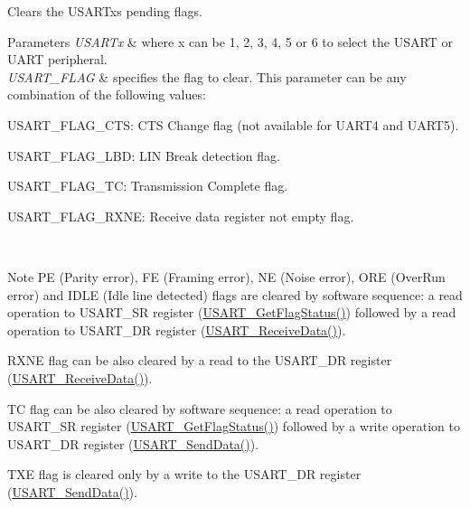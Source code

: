 Clears the U\+S\+A\+R\+Tx\textquotesingle{}s pending flags. 


\begin{DoxyParams}{Parameters}
{\em U\+S\+A\+R\+Tx} & where x can be 1, 2, 3, 4, 5 or 6 to select the U\+S\+A\+RT or U\+A\+RT peripheral. \\
\hline
{\em U\+S\+A\+R\+T\+\_\+\+F\+L\+AG} & specifies the flag to clear. This parameter can be any combination of the following values\+: \begin{DoxyItemize}
\item U\+S\+A\+R\+T\+\_\+\+F\+L\+A\+G\+\_\+\+C\+TS\+: C\+TS Change flag (not available for U\+A\+R\+T4 and U\+A\+R\+T5). \item U\+S\+A\+R\+T\+\_\+\+F\+L\+A\+G\+\_\+\+L\+BD\+: L\+IN Break detection flag. \item U\+S\+A\+R\+T\+\_\+\+F\+L\+A\+G\+\_\+\+TC\+: Transmission Complete flag. \item U\+S\+A\+R\+T\+\_\+\+F\+L\+A\+G\+\_\+\+R\+X\+NE\+: Receive data register not empty flag.\end{DoxyItemize}
\\
\hline
\end{DoxyParams}
\begin{DoxyNote}{Note}
PE (Parity error), FE (Framing error), NE (Noise error), O\+RE (Over\+Run error) and I\+D\+LE (Idle line detected) flags are cleared by software sequence\+: a read operation to U\+S\+A\+R\+T\+\_\+\+SR register (\hyperlink{group___u_s_a_r_t___group9_ga144630722defc9e312f0ad280b68e9da}{U\+S\+A\+R\+T\+\_\+\+Get\+Flag\+Status()}) followed by a read operation to U\+S\+A\+R\+T\+\_\+\+DR register (\hyperlink{group___u_s_a_r_t___group2_gac67a91845b0b1d54d31bdfb1c5e9867c}{U\+S\+A\+R\+T\+\_\+\+Receive\+Data()}). 

R\+X\+NE flag can be also cleared by a read to the U\+S\+A\+R\+T\+\_\+\+DR register (\hyperlink{group___u_s_a_r_t___group2_gac67a91845b0b1d54d31bdfb1c5e9867c}{U\+S\+A\+R\+T\+\_\+\+Receive\+Data()}). 

TC flag can be also cleared by software sequence\+: a read operation to U\+S\+A\+R\+T\+\_\+\+SR register (\hyperlink{group___u_s_a_r_t___group9_ga144630722defc9e312f0ad280b68e9da}{U\+S\+A\+R\+T\+\_\+\+Get\+Flag\+Status()}) followed by a write operation to U\+S\+A\+R\+T\+\_\+\+DR register (\hyperlink{group___u_s_a_r_t___group2_ga0b43d42da9540f446d494bf69823c6fb}{U\+S\+A\+R\+T\+\_\+\+Send\+Data()}). 

T\+XE flag is cleared only by a write to the U\+S\+A\+R\+T\+\_\+\+DR register (\hyperlink{group___u_s_a_r_t___group2_ga0b43d42da9540f446d494bf69823c6fb}{U\+S\+A\+R\+T\+\_\+\+Send\+Data()}).
\end{DoxyNote}

